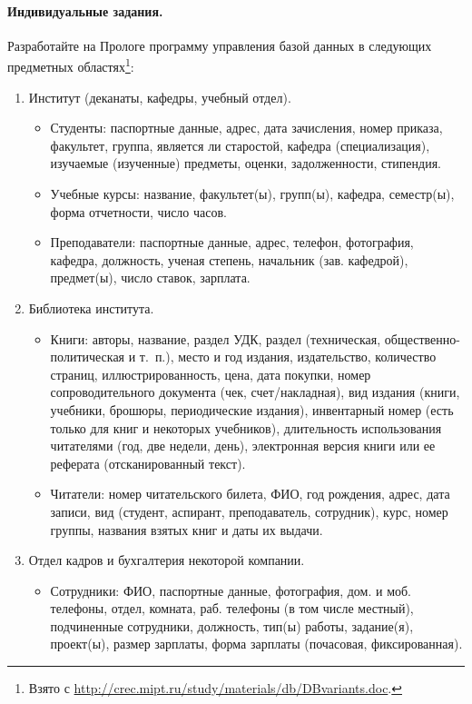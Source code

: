 \documentclass[12pt, openany, twoside]{book} %
\begin{document}
\paragraph{Индивидуальные задания.}
Разработайте на Прологе программу управления базой данных в следующих предметных областях\footnote{Взято с \url{http://crec.mipt.ru/study/materials/db/DBvariants.doc}.}:
\begin{enumerate}
\item Институт (деканаты, кафедры, учебный отдел).
\begin{itemize}
\item Студенты: паспортные данные, адрес, дата зачисления, номер приказа, факультет, группа, является ли старостой, кафедра (специализация), изучаемые (изученные) предметы, оценки, задолженности, стипендия.
\item Учебные курсы: название, факультет(ы), групп(ы), кафедра, семестр(ы), форма отчетности, число часов.
\item Преподаватели: паспортные данные, адрес, телефон, фотография, кафедра, должность, ученая степень, начальник (зав. кафедрой), предмет(ы), число ставок, зарплата.
\end{itemize}
\item Библиотека института.
\begin{itemize}
\item Книги: авторы, название, раздел УДК, раздел (техническая, общественно-политическая и т.~п.), место и год издания, издательство, количество страниц, иллюстрированность, цена, дата покупки, номер сопроводительного документа (чек, счет/накладная), вид издания (книги, учебники, брошюры, периодические издания), инвентарный номер (есть только для книг и некоторых учебников), длительность использования читателями (год, две недели, день), электронная версия книги или ее реферата (отсканированный текст).
\item Читатели: номер читательского билета, ФИО, год рождения, адрес, дата записи, вид (студент, аспирант, преподаватель, сотрудник), курс, номер группы, названия взятых книг и даты их выдачи.
\end{itemize}
\item Отдел кадров и бухгалтерия некоторой компании.
\begin{itemize}
\item Сотрудники: ФИО, паспортные данные, фотография, дом. и моб. телефоны, отдел, комната, раб. телефоны (в том числе местный), подчиненные сотрудники, должность, тип(ы) работы, задание(я), проект(ы), размер зарплаты, форма зарплаты (почасовая, фиксированная).

\end{itemize}
\end{enumerate}
\end{document}
